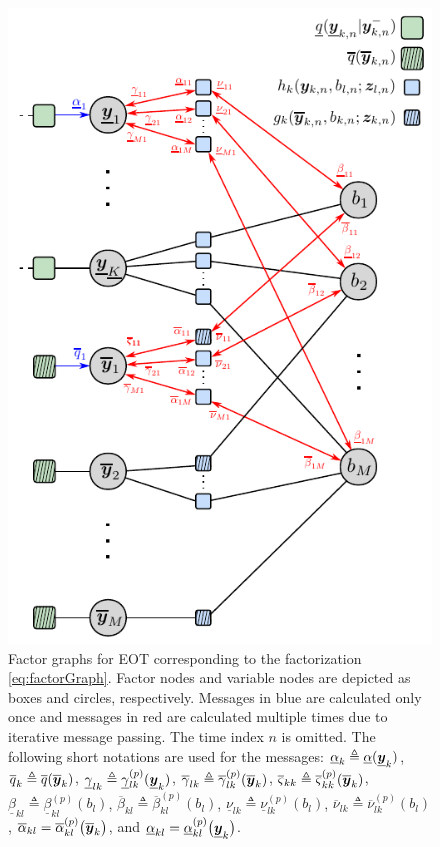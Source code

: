 \documentclass[10pt, twoside, romanappendices]{IEEEtran}
\begin{document}
\begin{figure}[t!]
\vspace{-2mm}
\centering
\hspace{-2.1mm}\includegraphics[scale=1.05]{./Figures/factorGraphMessages.pdf}
\vspace{-1mm}
\caption{Factor graphs for EOT corresponding to the factorization \eqref{eq:factorGraph}. Factor nodes and variable nodes are depicted as boxes and
circles, respectively. Messages in blue are calculated only once and messages in red are calculated multiple times due to iterative message passing. The time index $n$ is omitted. The following short notations are used for the messages: $\underline{\alpha}_k \triangleq \underline{\alpha}(\underline{\bm{y}}_{k})$, $\overline{q}_k \triangleq \overline{q}(\overline{\bm{y}}_{k})$, $\underline{\gamma}_{lk} \triangleq \underline{\gamma}^{(p)}_{lk}(\underline{\bm{y}}_{k})$, $\overline{\gamma}_{lk} \triangleq  \overline{\gamma}^{(p)}_{lk}(\overline{\bm{y}}_{k})$, $\overline{\varsigma}_{kk} \triangleq  \overline{\varsigma}^{(p)}_{kk}(\overline{\bm{y}}_{k})$, $\underline{\beta}_{kl}  \triangleq \underline{\beta}_{kl}^{(p)}(b_{l}) $,  $\overline{\beta}_{kl}  \triangleq \overline{\beta}_{kl}^{(p)}(b_{l}) $, $\underline{\nu}_{l k} \triangleq \underline{\nu}^{(p)}_{l k}(b_l)$, $\overline{\nu}_{l k} \triangleq \overline{\nu}^{(p)}_{l k}(b_l)$, $\overline{\alpha}_{kl} = \overline{\alpha}_{kl}^{(p)}\big(\overline{\bm{y}}_{k}\big) $, and $\underline{\alpha}_{kl} = \underline{\alpha}_{kl}^{(p)}\big(\underline{\bm{y}}_{k}\big) $.}

\end{figure}
\end{document}

